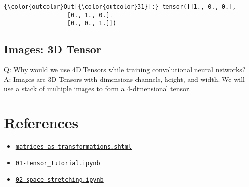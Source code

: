 \begin{Verbatim}[commandchars=\\\{\}]
{\color{outcolor}Out[{\color{outcolor}31}]:} tensor([[1., 0., 0.],
                  [0., 1., 0.],
                  [0., 0., 1.]])
\end{Verbatim}
\subsection{Images: 3D Tensor}
Q: Why would we use 4D Tensors while training convolutional neural networks?\\
A: Images are 3D Tensors with dimensions channels, height, and width. We will use a stack of multiple images to form a 4-dimensional tensor.


\section{References}
\begin{itemize}
\tightlist
\item
\href{https://www.technologyuk.net/mathematics/algebra/matrices-as-transformations.shtml}{\texttt{matrices-as-transformations.shtml}}
\item
\href{https://github.com/Atcold/pytorch-Deep-Learning-Minicourse/blob/master/01-tensor_tutorial.ipynb}{\texttt{01-tensor\_tutorial.ipynb}}
\item
\href{https://github.com/Atcold/pytorch-Deep-Learning-Minicourse/blob/master/02-space_stretching.ipynb}{\texttt{02-space\_stretching.ipynb}}
\end{itemize}